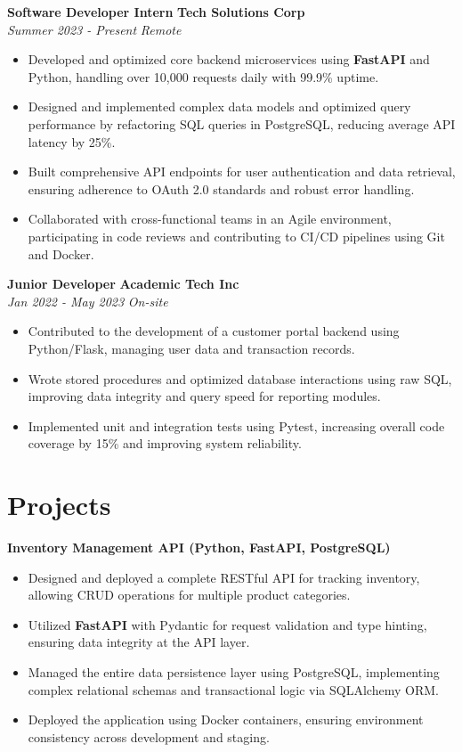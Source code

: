 \documentclass[10pt, letterpaper]{article}
\newcommand{\jobentry}[4]{
    \vspace{4pt}
    \textbf{#1} \hfill \textbf{#2} \\
    \textit{#3} \hfill \textit{#4}
    \vspace{-2pt}
}
\begin{document}
\jobentry{Software Developer Intern}{Tech Solutions Corp}{Summer 2023 - Present}{Remote}
\begin{itemize}[leftmargin=*, itemsep=1pt]
    \item Developed and optimized core backend microservices using \textbf{FastAPI} and Python, handling over 10,000 requests daily with 99.9\% uptime.
    \item Designed and implemented complex data models and optimized query performance by refactoring SQL queries in PostgreSQL, reducing average API latency by 25\%.
    \item Built comprehensive API endpoints for user authentication and data retrieval, ensuring adherence to OAuth 2.0 standards and robust error handling.
    \item Collaborated with cross-functional teams in an Agile environment, participating in code reviews and contributing to CI/CD pipelines using Git and Docker.
\end{itemize}

\jobentry{Junior Developer}{Academic Tech Inc}{Jan 2022 - May 2023}{On-site}
\begin{itemize}[leftmargin=*, itemsep=1pt]
    \item Contributed to the development of a customer portal backend using Python/Flask, managing user data and transaction records.
    \item Wrote stored procedures and optimized database interactions using raw SQL, improving data integrity and query speed for reporting modules.
    \item Implemented unit and integration tests using Pytest, increasing overall code coverage by 15\% and improving system reliability.
\end{itemize}

\section*{Projects}
\textbf{Inventory Management API (Python, FastAPI, PostgreSQL)}
\begin{itemize}[leftmargin=*, itemsep=1pt]
    \item Designed and deployed a complete RESTful API for tracking inventory, allowing CRUD operations for multiple product categories.
    \item Utilized \textbf{FastAPI} with Pydantic for request validation and type hinting, ensuring data integrity at the API layer.
    \item Managed the entire data persistence layer using PostgreSQL, implementing complex relational schemas and transactional logic via SQLAlchemy ORM.
    \item Deployed the application using Docker containers, ensuring environment consistency across development and staging.
\end{itemize}
\end{document}
